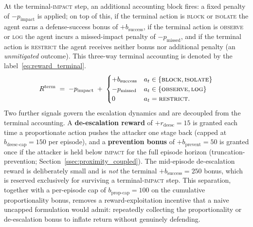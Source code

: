 At the terminal-\textsc{impact} step, an additional accounting block fires: a fixed penalty of $-p_{\mathrm{impact}}$ is applied; on top of this, if the terminal action is \textsc{block} or \textsc{isolate} the agent earns a defense-success bonus of $+b_{\mathrm{success}}$, if the terminal action is \textsc{observe} or \textsc{log} the agent incurs a missed-impact penalty of $-p_{\mathrm{missed}}$, and if the terminal action is \textsc{restrict} the agent receives neither bonus nor additional penalty (an \emph{unmitigated} outcome). This three-way terminal accounting is denoted by the label~\eqref{eq:reward_terminal}.
\begin{equation}\label{eq:reward_terminal}
R^{\mathrm{term}} \;=\; -p_{\mathrm{impact}} \;+\; \begin{cases} +b_{\mathrm{success}} & a_t \in \{\textsc{block}, \textsc{isolate}\} \\ -p_{\mathrm{missed}} & a_t \in \{\textsc{observe}, \textsc{log}\} \\ 0 & a_t = \textsc{restrict}. \end{cases}
\end{equation}
Two further signals govern the escalation dynamics and are decoupled from the terminal accounting. A \textbf{de-escalation reward} of $+r_{\mathrm{deesc}} = 15$ is granted each time a proportionate action pushes the attacker one stage back (capped at $b_{\mathrm{deesc\text{-}cap}} = 150$ per episode), and a \textbf{prevention bonus} of $+b_{\mathrm{prevent}} = 50$ is granted once if the attacker is held below \textsc{impact} for the full episode horizon (truncation-prevention; Section~\ref{ssec:proximity_coupled}). The mid-episode de-escalation reward is deliberately small and is \emph{not} the terminal $+b_{\mathrm{success}} = 250$ bonus, which is reserved exclusively for surviving a terminal-\textsc{impact} step. This separation, together with a per-episode cap of $b_{\mathrm{prop\text{-}cap}} = 100$ on the cumulative proportionality bonus, removes a reward-exploitation incentive that a naive uncapped formulation would admit: repeatedly collecting the proportionality or de-escalation bonus to inflate return without genuinely defending.

